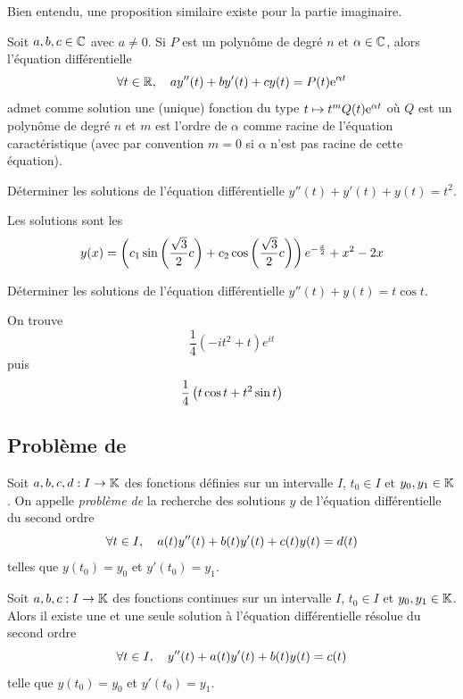 \documentclass{magnoliaold}
\begin{document}
\begin{remarqueUnique}
\remarque Bien entendu, une proposition similaire existe pour la partie imaginaire.
\end{remarqueUnique}

\begin{proposition}[utile=-3]
Soit $a,b,c\in\mathbb{C}$ avec $a\neq 0$. Si $P$ est un polynôme de degré $n$ et
$\alpha\in\mathbb{C}$, alors l'équation différentielle
\[\forall t\in \mathbb{R} ,\quad ay''(t)+by'(t)+cy(t)=P(t){\rm e}^{\alpha t}\]
admet comme solution une (unique) fonction du type
$t\mapsto t^m Q(t){\rm e}^{\alpha t}$ où $Q$ est un polynôme de degré $n$ et
$m$ est l'ordre de $\alpha$ comme racine de l'équation
caractéristique (avec par convention $m=0$ si $\alpha$ n'est pas racine
de cette équation).
\end{proposition}

\begin{exos}
\exo Déterminer les solutions de l'équation différentielle
  $y''(t)+y'(t)+y(t)=t^2$.
  \begin{sol}
  Les solutions sont les
  \[y(x)=\left(c_1\sin\left(\frac{\sqrt{3}}{2}c\right)+c_2\cos\left(\frac{\sqrt{3}}{2}c\right)\right)
    e^{-\frac{x}{2}}+x^2-2x\]
  \end{sol}
\exo Déterminer les solutions de l'équation différentielle
  $y''(t)+y(t)=t\cos t$.
  \begin{sol}
  On trouve
  \[\frac{1}{4}(-it^2+t)e^{it}\]
  puis
  \[\frac{1}{4}\left(t\cos t+t^2\sin t\right)\]
  \end{sol}
\end{exos}

\subsection{Problème de }

\begin{definition}[nom={Problème de \nom{Cauchy}}]
Soit $a,b,c,d:I\to\mathbb{K}$ des fonctions définies sur un intervalle $I$, $t_0\in I$ et
$y_0,y_1\in\mathbb{K}$. On appelle \emph{problème de } la recherche des solutions $y$ de
l'équation différentielle du second ordre
\[\forall t\in I ,\quad a(t)y''(t)+b(t)y'(t)+c(t)y(t)=d(t)\]
telles que $y(t_0)=y_0$ et $y'(t_0)=y_1$.
\end{definition}

\begin{theoreme}[nom={Théorème de \nom{Cauchy-Lipschitz}}]
Soit $a,b,c:I\to\mathbb{K}$ des fonctions continues sur un intervalle $I$,
$t_0\in I$ et $y_0,y_1\in\mathbb{K}$. Alors il existe une et une seule solution à
l'équation différentielle résolue du second ordre
\[\forall t\in I ,\quad y''(t)+a(t)y'(t)+b(t)y(t)=c(t)\]
telle que $y(t_0)=y_0$ et $y'(t_0)=y_1$.
\end{theoreme}
\end{document}

